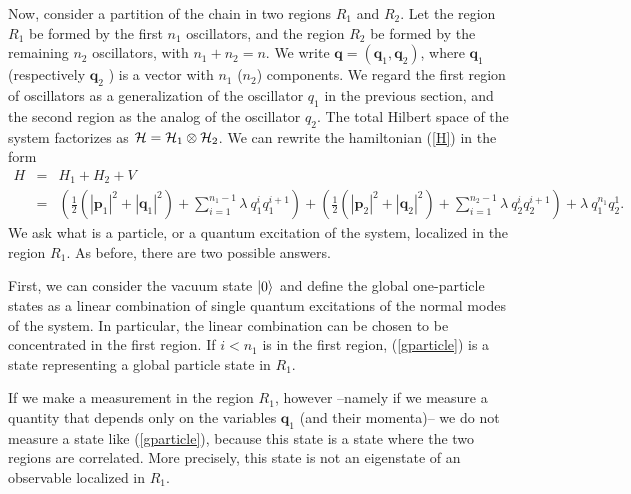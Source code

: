 \documentclass[11pt, nofootinbib]{revtex4-2}
\newcommand{\bea}{\begin{eqnarray}}
\newcommand{\eea}{\end{eqnarray}}
\begin{document}
Now, consider a partition of the chain in two regions $R_{1}$ and
$R_{2}$.  Let the region $R_{1}$ be formed by the first $n_{1}$
oscillators, and the region $R_{2}$ be formed by the remaining $n_{2}$
oscillators, with $n_{1}+n_{2}=n$.  We write $\mathbf q=(\mathbf
q_{1},\mathbf{q}_{2})$, where $\mathbf q_{1}$ (respectively $\mathbf
q_{2}$ ) is a vector with $n_{1}$ ($n_{2}$) components.  We regard the
first region of oscillators as a generalization of the oscillator
$q_{1}$ in the previous section, and the second region as the analog of
the oscillator $q_{2}$.  The total Hilbert space of the system
factorizes as ${\cal H}={\cal H}_{1}\otimes{\cal H}_{2}$.  We can
rewrite the hamiltonian (\ref{H}) in the form
%
\bea 
H&=& H_{1}+H_{2}+V 
\\ \nonumber &=& 
\left(\frac{1}{2}\left(|\mathbf p_1|^2 + |\mathbf q_1|^2
\right) + \sum_{i=1}^{n_{1}-1} \lambda \ q_{1}^iq_1^{i+1}\right)
+ \left(\frac{1}{2}\left(|\mathbf p_2|^2 + |\mathbf q_2|^2
\right) + \sum_{i=1}^{n_{2}-1} \lambda \ q_{2}^iq_2^{i+1}\right)
+ \lambda\ q_1^{n_{1}}q_2^1.
\eea
%
We ask what is a particle, or a quantum excitation of the system,
localized in the region $R_{1}$.  As before, there are two possible
answers.

First, we can consider the vacuum state $|0 \rangle_{\rm }$ and define
the global one-particle states as a linear combination of single
quantum excitations of the normal modes of the system.  In particular,
the linear combination can be chosen to be concentrated in the first
region.  If $i<n_{1}$ is in the first region, (\ref{gparticle}) is a
state representing a global particle state in $R_{1}$.

If we make a measurement in the region $R_{1}$, however --namely if
we measure a quantity that depends only on the variables $\mathbf
q_{1}$ (and their momenta)-- we do not measure a state like
(\ref{gparticle}), because this state is a state where the two regions
are correlated.  More precisely, this state is not an eigenstate of an
observable localized in $R_{1}$.  
\end{document}
